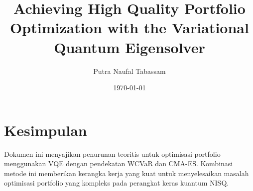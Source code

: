 \documentclass[12pt,a4paper]{article}
\title{Achieving High Quality Portfolio Optimization with the Variational Quantum Eigensolver}
\author{Putra Naufal Tabassam}
\date{\today}
\begin{document}
\maketitle

\tableofcontents
\newpage


\pagebreak

\pagebreak

\pagebreak


\section{Kesimpulan}

Dokumen ini menyajikan penurunan teoritis untuk optimisasi portfolio menggunakan VQE dengan pendekatan WCVaR dan CMA-ES. Kombinasi metode ini memberikan kerangka kerja yang kuat untuk menyelesaikan masalah optimisasi portfolio yang kompleks pada perangkat keras kuantum NISQ.
\end{document}
